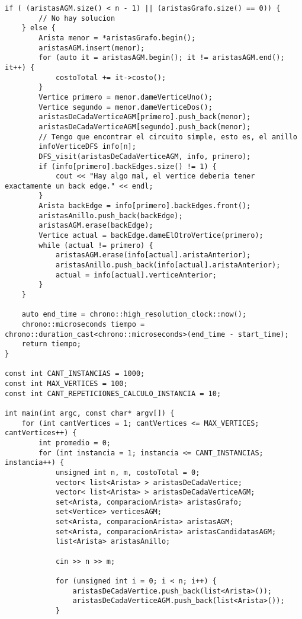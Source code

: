 \begin{lstlisting}[frame=single]
    if ( (aristasAGM.size() < n - 1) || (aristasGrafo.size() == 0)) {
        // No hay solucion
    } else {
        Arista menor = *aristasGrafo.begin();
        aristasAGM.insert(menor);
        for (auto it = aristasAGM.begin(); it != aristasAGM.end(); it++) {
            costoTotal += it->costo();
        }
        Vertice primero = menor.dameVerticeUno();
        Vertice segundo = menor.dameVerticeDos();
        aristasDeCadaVerticeAGM[primero].push_back(menor);
        aristasDeCadaVerticeAGM[segundo].push_back(menor);
        // Tengo que encontrar el circuito simple, esto es, el anillo
        infoVerticeDFS info[n];
        DFS_visit(aristasDeCadaVerticeAGM, info, primero);
        if (info[primero].backEdges.size() != 1) {
            cout << "Hay algo mal, el vertice deberia tener exactamente un back edge." << endl;
        }
        Arista backEdge = info[primero].backEdges.front();
        aristasAnillo.push_back(backEdge);
        aristasAGM.erase(backEdge);
        Vertice actual = backEdge.dameElOtroVertice(primero);
        while (actual != primero) {
            aristasAGM.erase(info[actual].aristaAnterior);
            aristasAnillo.push_back(info[actual].aristaAnterior);
            actual = info[actual].verticeAnterior;
        }
    }
    
    auto end_time = chrono::high_resolution_clock::now();
    chrono::microseconds tiempo = chrono::duration_cast<chrono::microseconds>(end_time - start_time);
    return tiempo;
}

const int CANT_INSTANCIAS = 1000;
const int MAX_VERTICES = 100;
const int CANT_REPETICIONES_CALCULO_INSTANCIA = 10;

int main(int argc, const char* argv[]) {
    for (int cantVertices = 1; cantVertices <= MAX_VERTICES; cantVertices++) {
        int promedio = 0;
        for (int instancia = 1; instancia <= CANT_INSTANCIAS; instancia++) {
            unsigned int n, m, costoTotal = 0;
            vector< list<Arista> > aristasDeCadaVertice;
            vector< list<Arista> > aristasDeCadaVerticeAGM;
            set<Arista, comparacionArista> aristasGrafo;
            set<Vertice> verticesAGM;
            set<Arista, comparacionArista> aristasAGM;
            set<Arista, comparacionArista> aristasCandidatasAGM;
            list<Arista> aristasAnillo;
            
            cin >> n >> m;
            
            for (unsigned int i = 0; i < n; i++) {
                aristasDeCadaVertice.push_back(list<Arista>());
                aristasDeCadaVerticeAGM.push_back(list<Arista>());
            }
            

\end{lstlisting}
